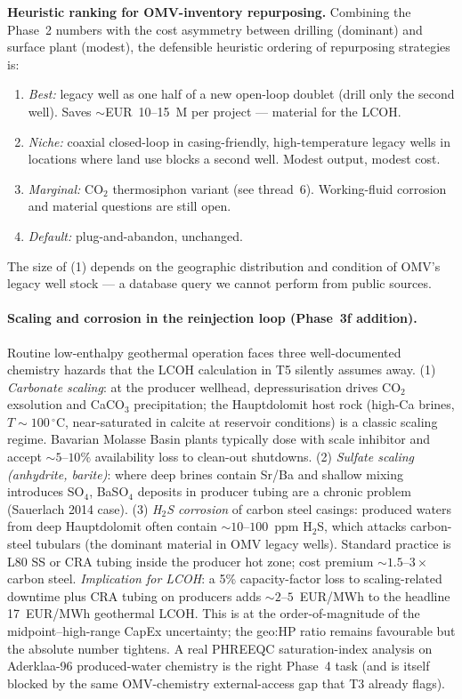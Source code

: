 \documentclass{article}
\begin{document}
\textbf{Heuristic ranking for OMV-inventory repurposing.} Combining
the Phase~2 numbers with the cost asymmetry between drilling
(dominant) and surface plant (modest), the defensible heuristic
ordering of repurposing strategies is:
\begin{enumerate}
\item \emph{Best:} legacy well as one half of a new open-loop
doublet (drill only the second well). Saves $\sim$EUR~10--15~M
per project --- material for the LCOH.
\item \emph{Niche:} coaxial closed-loop in casing-friendly,
high-temperature legacy wells in locations where land use blocks
a second well. Modest output, modest cost.
\item \emph{Marginal:} CO$_2$ thermosiphon variant
(see thread~6). Working-fluid corrosion and material questions
are still open.
\item \emph{Default:} plug-and-abandon, unchanged.
\end{enumerate}
The size of (1) depends on the geographic distribution and
condition of OMV's legacy well stock --- a database query we
cannot perform from public sources.

\paragraph{Scaling and corrosion in the reinjection loop
(Phase~3f addition).} Routine low-enthalpy geothermal operation
faces three well-documented chemistry hazards that the LCOH
calculation in T5 silently assumes away. (1) \emph{Carbonate
scaling}: at the producer wellhead, depressurisation drives
CO$_2$ exsolution and CaCO$_3$ precipitation; the Hauptdolomit
host rock (high-Ca brines, $T \sim 100\,^\circ$C, near-saturated
in calcite at reservoir conditions) is a classic scaling regime.
Bavarian Molasse Basin plants typically dose with scale
inhibitor and accept $\sim 5$--$10\%$ availability loss to
clean-out shutdowns. (2) \emph{Sulfate scaling (anhydrite,
barite)}: where deep brines contain Sr/Ba and shallow mixing
introduces SO$_4$, BaSO$_4$ deposits in producer tubing
are a chronic problem (Sauerlach 2014 case). (3) \emph{H$_2$S
corrosion} of carbon steel casings: produced waters from deep
Hauptdolomit often contain $\sim 10$--$100$~ppm H$_2$S, which
attacks carbon-steel tubulars (the dominant material in OMV
legacy wells). Standard practice is L80 SS or CRA tubing inside
the producer hot zone; cost premium $\sim 1.5$--$3\times$
carbon steel. \emph{Implication for LCOH}: a 5\% capacity-factor
loss to scaling-related downtime plus CRA tubing on producers
adds $\sim 2$--$5$~EUR/MWh to the headline 17~EUR/MWh
geothermal LCOH. This is at the order-of-magnitude of the
midpoint--high-range CapEx uncertainty; the geo:HP ratio
remains favourable but the absolute number tightens. A real
PHREEQC saturation-index analysis on Aderklaa-96 produced-water
chemistry is the right Phase~4 task (and is itself blocked by
the same OMV-chemistry external-access gap that T3 already
flags).
\end{document}
